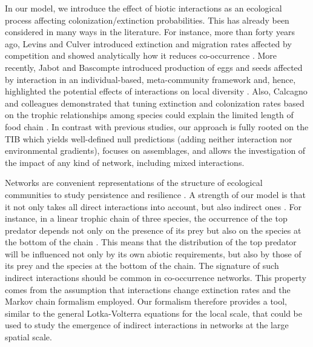 In our model, we introduce the effect of biotic interactions as an ecological process affecting colonization/extinction probabilities. This has already been considered in many ways in the literature. For instance, more than forty years ago, Levins and Culver introduced extinction and migration rates affected by competition and showed analytically how it reduces co-occurrence \citep{Levins1971Regional}. More recently, Jabot and Bascompte introduced production of eggs and seeds affected by interaction in an individual-based, meta-community framework and, hence, highlighted the potential effects of interactions on local diversity \citep{Jabot2012Bitrophic}. Also, Calcagno and colleagues demonstrated that tuning extinction and colonization rates based on the trophic relationships among species could explain the limited length of food chain \citep{Calcagno2011Constraints}. In contrast with previous studies, our approach is fully rooted on the TIB which yields well-defined null predictions (adding neither interaction nor environmental gradients), focuses on assemblages, and allows the investigation of the impact of any kind of network, including mixed interactions.

Networks are convenient representations of the structure of ecological communities to study persistence and resilience \citep{Thebault2010Stability}. A strength of our model is that it not only takes all direct interactions into account, but also indirect ones \citep{Wootton1994Nature}. For instance, in a linear trophic chain of three species, the occurrence of the top predator depends not only on the presence of its prey but also on the species at the bottom of the chain \citep{Gravel2011Trophic}. This means that the distribution of the top predator will be influenced not only by its own abiotic requirements, but also by those of its prey and the species at the bottom of the chain. The signature of such indirect interactions should be common in co-occurrence networks. This property comes from the assumption that interactions change extinction rates and the Markov chain formalism employed. Our formalism therefore provides a tool, similar to the general Lotka-Volterra equations for the local scale, that could be used to study the emergence of indirect interactions in networks at the large spatial scale.

